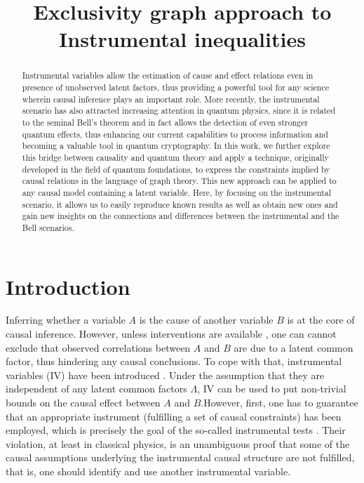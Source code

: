 \documentclass[letterpaper]{article}
\title{Exclusivity graph approach to Instrumental inequalities}
\author{} %
\begin{document}
\maketitle

\begin{abstract}
Instrumental variables allow the estimation of cause and effect relations even
in presence of unobserved latent factors, thus providing a powerful tool for any
science wherein causal inference plays an important role. More recently, the
instrumental scenario has also attracted increasing attention in quantum
physics, since it is related to the seminal Bell's theorem and in fact allows
the detection of even stronger quantum effects, thus enhancing our current
capabilities to process information and becoming a valuable tool in quantum
cryptography. In this work, we further explore this bridge between causality and
quantum theory and apply a technique, originally developed in the field of
quantum foundations, to express the constraints implied by causal relations in
the language of graph theory. This new approach can be applied to any causal
model containing a latent variable. Here, by focusing on the instrumental
scenario, it allows us to easily reproduce known results as well as obtain new
ones and gain new insights on the connections and differences between the
instrumental and the Bell scenarios. 
\end{abstract}

\section{Introduction}
Inferring  whether a variable $A$ is the cause of another variable $B$ is at the
core of causal inference. However, unless interventions are available
\cite{pearlbook}, one can cannot exclude that observed correlations between $A$
and $B$ are due to a latent common factor, thus hindering any causal
conclusions. To cope with that, instrumental variables (IV) have been introduced
\cite{pearl1995, bonet2001}. Under the assumption that they are independent of
any latent common factors $\Lambda$, IV can be used to put non-trivial bounds on the
causal effect between $A$ and $B$.However, first, one has to guarantee that
an appropriate instrument (fulfilling a set of causal constraints) has been
employed, which is precisely the goal of the so-called instrumental tests
\cite{pearl1995, bonet2001,Ramsahai2012,Kedagni2017}. Their violation, at least in classical physics, is
an unambiguous proof that some of the causal assumptions underlying the
instrumental causal structure are not fulfilled, that is, one should identify
and use another instrumental variable.
\end{document}
